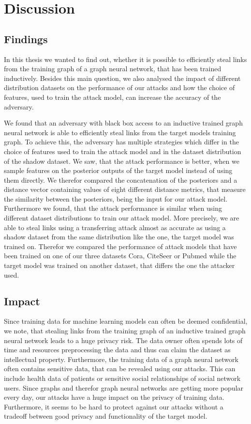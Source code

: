 \chapter{Discussion}

    \section{Findings}
        In this thesis we wanted to find out, whether it is possible to efficiently steal links from the training graph of a graph neural network, that has been trained inductively.
        Besides this main question, we also analysed the impact of different distribution datasets on the performance of our attacks and how the choice of features, used to train the attack model, can increase the accuracy of the adversary.

        We found that an adversary with black box access to an inductive trained graph neural network is able to efficiently steal links from the target models training graph.
        To achieve this, the adversary has multiple strategies which differ in the choice of features used to train the attack model and in the dataset distribution of the shadow dataset.
        We saw, that the attack performance is better, when we sample features on the posterior outputs of the target model instead of using them directly.
        We therefor compared the concatenation of the posteriors and a distance vector containing values of eight different distance metrics, that measure the similarity between the posteriors, being the input for our attack model.
        Furthermore we found, that the attack performance is similar when using different dataset distributions to train our attack model.
        More precisely, we are able to steal links using a transferring attack almost as accurate as using a shadow dataset from the same distribution like the one, the target model was trained on.
        Therefor we compared the performance of attack models that have been trained on one of our three datasets Cora, CiteSeer or Pubmed while the target model was trained on another dataset, that differs the one the attacker used.

    \section{Impact}
        Since training data for machine learning models can often be deemed confidential, we note, that stealing links from the training graph of an inductive trained graph neural network leads to a huge privacy risk.
        The data owner often spends lots of time and resources preprocessing the data and thus can claim the dataset as intellectual property.
        Furthermore, the training data of a graph neural network often contains sensitive data, that can be revealed using our attacks.
        This can include health data of patients or sensitive social relationships of social network users.
        Since graphs and therefor graph neural networks are getting more popular every day, our attacks have a huge impact on the privacy of training data.
        Furthermore, it seems to be hard to protect against our attacks without a tradeoff between good privacy and functionality of the target model. 

